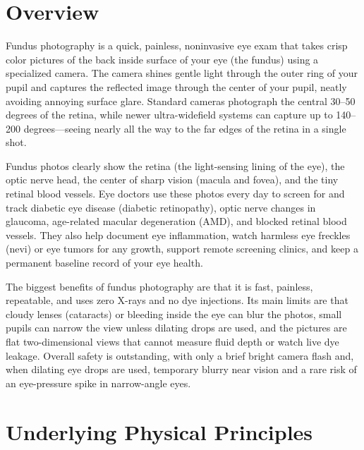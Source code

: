\label{ch:infographic-fundus}

\section{Overview}

Fundus photography is a quick, painless, noninvasive eye exam that takes crisp color pictures of the back inside surface of your eye (the fundus) using a specialized camera. The camera shines gentle light through the outer ring of your pupil and captures the reflected image through the center of your pupil, neatly avoiding annoying surface glare. Standard cameras photograph the central 30--50 degrees of the retina, while newer ultra-widefield systems can capture up to 140--200 degrees---seeing nearly all the way to the far edges of the retina in a single shot.

Fundus photos clearly show the retina (the light-sensing lining of the eye), the optic nerve head, the center of sharp vision (macula and fovea), and the tiny retinal blood vessels. Eye doctors use these photos every day to screen for and track diabetic eye disease (diabetic retinopathy), optic nerve changes in glaucoma, age-related macular degeneration (AMD), and blocked retinal blood vessels. They also help document eye inflammation, watch harmless eye freckles (nevi) or eye tumors for any growth, support remote screening clinics, and keep a permanent baseline record of your eye health.

The biggest benefits of fundus photography are that it is fast, painless, repeatable, and uses zero X-rays and no dye injections. Its main limits are that cloudy lenses (cataracts) or bleeding inside the eye can blur the photos, small pupils can narrow the view unless dilating drops are used, and the pictures are flat two-dimensional views that cannot measure fluid depth or watch live dye leakage. Overall safety is outstanding, with only a brief bright camera flash and, when dilating eye drops are used, temporary blurry near vision and a rare risk of an eye-pressure spike in narrow-angle eyes.

\section{Underlying Physical Principles}

